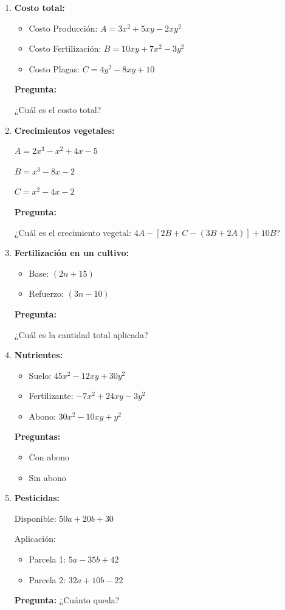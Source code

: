 \documentclass[12pt]{article}
\begin{document}
	\begin{enumerate}
		
		\item \textbf{Costo total:}
		
			\begin{itemize}
				\item Costo Producción: $A = 3x^2 	+ 5xy - 2xy^2$
				\item Costo Fertilización: $B = 10xy + 7x^2 - 3y^2$
				\item Costo Plagas: $C = 4y^2 - 8xy + 10$
			\end{itemize}
			
			\textbf{Pregunta:}
			
			¿Cuál es el costo total?
			
		\item \textbf{Crecimientos vegetales:}
					
			$A = 2x^3 - x^2 + 4x - 5$
			
			$B = x^3 - 8x - 2$
			
			$C = x^2 - 4x - 2$
			
			\textbf{Pregunta:} 
		
			¿Cuál es el crecimiento vegetal: $4A - [2B + C - (3B + 2A)] +10B$?
		
		\item \textbf{Fertilización en un cultivo:}
			
			\begin{itemize}
				\item Base: $(2n + 15)$
				\item Refuerzo: $(3n - 10)$
			\end{itemize}
			
			\textbf{Pregunta:}
			 
			¿Cuál es la cantidad total aplicada?
	 
		\item \textbf{Nutrientes:}
		
			\begin{itemize}
				\item Suelo: $45x^2 - 12xy + 30y^2$
				\item Fertilizante: $-7x^2 + 24xy - 3y^2$
				\item Abono: $30x^2 - 10xy + y^2$
			\end{itemize}
			
			\textbf{Preguntas:}
			
			\begin{itemize}
				\item Con abono
				\item Sin abono
			\end{itemize}
			
		\item \textbf{Pesticidas:}
			
			Disponible: $50a + 20b + 30$
			
			Aplicación:
			
			\begin{itemize}
				\item Parcela 1: $5a - 35b + 42$
				\item Parcela 2: $32a + 10b - 22$
			\end{itemize}
			
			\textbf{Pregunta:}  
			¿Cuánto queda?
			
	\end{enumerate}
\end{document}
